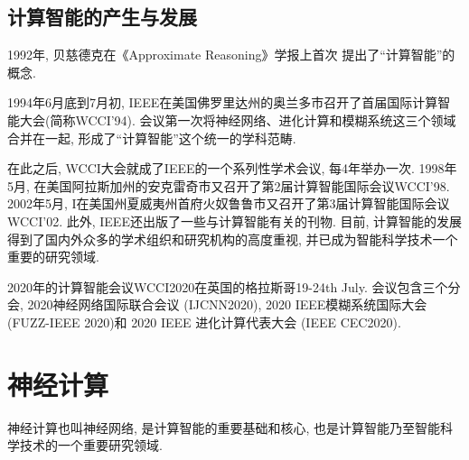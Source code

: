 \subsection{计算智能的产生与发展}
1992年, 贝慈德克在《Approximate Reasoning》学报上首次 提出了“计算智能”的概念.

%
%
1994年6月底到7月初, IEEE在美国佛罗里达州的奥兰多市召开了首届国际计算智能大会(简称WCCI'94). 会议第一次将神经网络、进化计算和模糊系统这三个领域合并在一起, 形成了“计算智能”这个统一的学科范畴.

在此之后, WCCI大会就成了IEEE的一个系列性学术会议, 每4年举办一次. 1998年5月, 在美国阿拉斯加州的安克雷奇市又召开了第2届计算智能国际会议WCCI’98.
2002年5月, I在美国州夏威夷州首府火奴鲁鲁市又召开了第3届计算智能国际会议WCCI'02.
此外, IEEE还出版了一些与计算智能有关的刊物.
目前, 计算智能的发展得到了国内外众多的学术组织和研究机构的高度重视, 并已成为智能科学技术一个重要的研究领域.

2020年的计算智能会议WCCI2020在英国的格拉斯哥19-24th July. 会议包含三个分会, 2020神经网络国际联合会议 (IJCNN2020), 2020 IEEE模糊系统国际大会 (FUZZ-IEEE 2020)和 2020 IEEE 进化计算代表大会 (IEEE CEC2020).
\section{神经计算}
神经计算也叫神经网络, 是计算智能的重要基础和核心, 也是计算智能乃至智能科学技术的一个重要研究领域.

